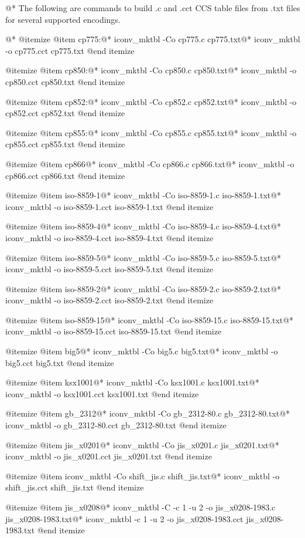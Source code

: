 @*
The following are commands to build .c and .cct CCS table files from .txt 
files for several supported encodings.

@*
@itemize
@item
cp775:@*
iconv_mktbl -Co cp775.c cp775.txt@*
iconv_mktbl -o cp775.cct cp775.txt
@end itemize

@itemize
@item
cp850:@*
iconv_mktbl -Co cp850.c cp850.txt@*
iconv_mktbl -o cp850.cct cp850.txt
@end itemize

@itemize
@item
cp852:@*
iconv_mktbl -Co cp852.c cp852.txt@*
iconv_mktbl -o cp852.cct cp852.txt
@end itemize

@itemize
@item
cp855:@*
iconv_mktbl -Co cp855.c cp855.txt@*
iconv_mktbl -o cp855.cct cp855.txt
@end itemize

@itemize
@item
cp866@*
iconv_mktbl -Co cp866.c cp866.txt@*
iconv_mktbl -o cp866.cct cp866.txt
@end itemize

@itemize
@item
iso-8859-1@*
iconv_mktbl -Co iso-8859-1.c iso-8859-1.txt@*
iconv_mktbl -o iso-8859-1.cct iso-8859-1.txt
@end itemize

@itemize
@item
iso-8859-4@*
iconv_mktbl -Co iso-8859-4.c iso-8859-4.txt@*
iconv_mktbl -o iso-8859-4.cct iso-8859-4.txt
@end itemize

@itemize
@item
iso-8859-5@*
iconv_mktbl -Co iso-8859-5.c iso-8859-5.txt@*
iconv_mktbl -o iso-8859-5.cct iso-8859-5.txt
@end itemize

@itemize
@item
iso-8859-2@*
iconv_mktbl -Co iso-8859-2.c iso-8859-2.txt@*
iconv_mktbl -o iso-8859-2.cct iso-8859-2.txt
@end itemize

@itemize
@item
iso-8859-15@*
iconv_mktbl -Co iso-8859-15.c iso-8859-15.txt@*
iconv_mktbl -o iso-8859-15.cct iso-8859-15.txt
@end itemize

@itemize
@item
big5@*
iconv_mktbl -Co big5.c big5.txt@*
iconv_mktbl -o big5.cct big5.txt
@end itemize

@itemize
@item
ksx1001@*
iconv_mktbl -Co ksx1001.c ksx1001.txt@*
iconv_mktbl -o ksx1001.cct ksx1001.txt
@end itemize

@itemize
@item
gb_2312@*
iconv_mktbl -Co gb_2312-80.c gb_2312-80.txt@*
iconv_mktbl -o gb_2312-80.cct gb_2312-80.txt
@end itemize

@itemize
@item
jis_x0201@*
iconv_mktbl -Co jis_x0201.c jis_x0201.txt@*
iconv_mktbl -o jis_x0201.cct jis_x0201.txt
@end itemize

@itemize
@item
iconv_mktbl -Co shift_jis.c shift_jis.txt@*
iconv_mktbl -o shift_jis.cct shift_jis.txt
@end itemize

@itemize
@item
jis_x0208@*
iconv_mktbl -C -c 1 -u 2 -o jis_x0208-1983.c jis_x0208-1983.txt@*
iconv_mktbl -c 1 -u 2 -o jis_x0208-1983.cct jis_x0208-1983.txt
@end itemize

